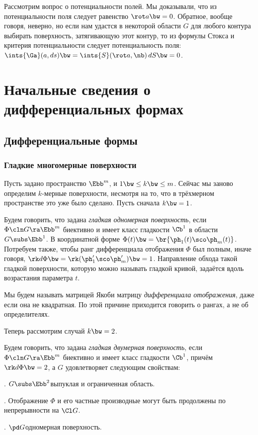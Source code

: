 \documentclass[a4paper]{article}
\begin{document}
Рассмотрим вопрос о потенциальности полей. Мы доказывали, что из потенциальности поля следует равенство
$\rot a \bw= 0$. Обратное, вообще говоря, неверно, но если нам удастся в некоторой области $G$ для
любого контура выбирать поверхность, затягивающую этот контур, то из формулы Стокса и критерия
потенциальности следует потенциальность поля:
$\ints{\Ga}(a, d s) \bw= \ints{S}(\rot a, \nb)\,d S  \bw= 0$.

\section{Начальные сведения о дифференциальных формах}

\subsection{Дифференциальные формы}

\subsubsection{Гладкие многомерные поверхности}
Пусть задано пространство $\Ebb^m$, и $1 \bw\le k \bw\le m$. Сейчас мы заново определим $k$-мерные поверхности,
несмотря на то, что в трёхмерном пространстве это уже было сделано. Пусть сначала $k \bw= 1$.

\begin{df}
Будем говорить, что задана \emph{гладкая одномерная поверхность}, если
$\Phi\cln G \ra \Ebb^m$ биективно и имеет класс гладкости $\Cb^1$ в области $G \subs \Ebb^1$.
В координатной форме $\Phi(t) \bw= \br{\ph_1(t)\sco \ph_m(t)}$.
Потребуем также, чтобы ранг дифференциала отображения $\Phi$ был полным, иначе говоря,
$\rk d\Phi \bw= \rk (\ph_1'\sco \ph_m') \bw= 1$. Направление обхода такой гладкой поверхности,
которую можно называть гладкой кривой, задаётся вдоль возрастания параметра $t$.
\end{df}

\begin{note}
Мы будем называть матрицей Якоби матрицу \emph{дифференциала отображения}, даже если она не квадратная.
По этой причине приходится говорить о рангах, а не об определителях.
\end{note}

Теперь рассмотрим случай $k \bw= 2$.

\begin{df}
Будем говорить, что задана \emph{гладкая двумерная поверхность}, если
$\Phi\cln G \ra \Ebb^m$ биективно и имеет класс гладкости $\Cb^1$, причём $\rk d\Phi \bw= 2$, а
$G$ удовлетворяет следующим свойствам:

. $G \subs \Ebb^2$\т выпуклая и ограниченная область.

. Отображение $\Phi$ и его частные производные могут быть продолжены по непрерывности на $\Cl G$.

. $\pd G$\т одномерная поверхность.
\end{df}
\end{document}
